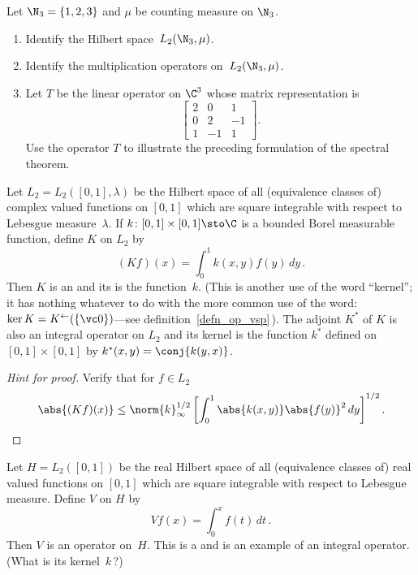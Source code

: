 \begin{exer} Let $\N_3 = \{1,2,3\}$ and $\mu$ be counting measure on $\N_3$.
 \begin{enumerate}
  \item[(a)] Identify the Hilbert space~$L_2(\N_3,\mu)$.
  \item[(b)] Identify the multiplication operators on~$L_2(\N_3,\mu)$.
  \item[(c)] Let $T$ be the linear operator on $\C^3$ whose matrix
representation is
   \[ \begin{bmatrix}
          2  &  0  &  1 \\
          0  &  2  & -1 \\
          1  & -1  &  1
      \end{bmatrix}.\]
Use the operator $T$ to illustrate the preceding formulation of the spectral theorem.
 \end{enumerate}
\end{exer}

\begin{exam}\label{exam_int_op} Let $L_2 = L_2([0,1],\lambda)$ be the Hilbert space of all (equivalence classes of)
complex valued functions on $[0,1]$ which are square integrable with respect to Lebesgue measure~$\lambda$.
If $k\colon [0,1] \times [0,1] \sto \C$ is a bounded Borel measurable function, define  $K$ on $L_2$ by
   \[ (Kf)(x) = \int_0^1 k(x,y)f(y)\,dy\,. \]
Then $K$ is an
 and its
 is the function~$k$.  (This is another use of the word ``kernel''; it has nothing whatever to do
with the more common use of the word: $\ker K = K^{\gets}(\{\vc 0\})$---see definition~\ref{defn_op_vsp}\,).
The adjoint $K^*$ of $K$ is also an integral operator on $L_2$ and its
kernel is the function $k^*$ defined on $[0,1] \times [0,1]$ by $k^*(x,y) = \conj{k(y,x)}$.
\end{exam}

\begin{proof}[\emph{Hint for proof}] Verify that for $f \in L_2$
   \[ \abs{(Kf)(x)} \le \norm{k}_\infty^{1/2}\left[ \int_0^1 \abs{k(x,y)}\abs{f(y)}^2\,dy\right]^{1/2}.\]
\ns
\end{proof}

\begin{exam}\label{000319}  Let $H = L_2([0,1])$ be the real Hilbert space of all (equivalence classes of) real
valued functions on $[0,1]$ which are square integrable with respect to Lebesgue measure. Define $V$ on $H$ by
   \begin{equation}\label{000319i}
       Vf(x) = \int_0^x f(t)\,dt\,.
   \end{equation}
Then $V$ is an operator on~$H$. This is a
 and is an example of an integral operator. (What is its kernel~$k$\,?)
\end{exam}

